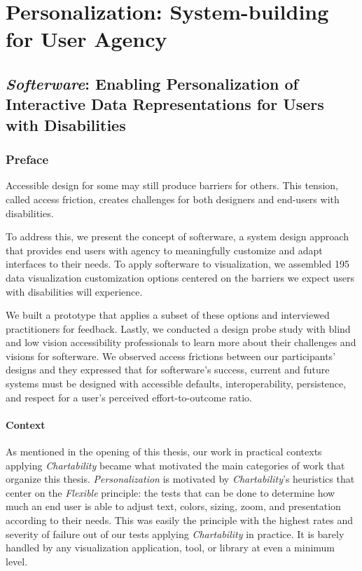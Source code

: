 \documentclass[12pt]{cmuthesis}
\begin{document}
\part{Personalization: System-building for User Agency}

\chapter{\textit{Softerware}: Enabling Personalization of Interactive Data Representations for Users with Disabilities}

\section{Preface}

Accessible design for some may still produce barriers for others. This tension, called access friction, creates challenges for both designers and end-users with disabilities.

To address this, we present the concept of softerware, a system design approach that provides end users with agency to meaningfully customize and adapt interfaces to their needs. To apply softerware to visualization, we assembled 195 data visualization customization options centered on the barriers we expect users with disabilities will experience.

We built a prototype that applies a subset of these options and interviewed practitioners for feedback. Lastly, we conducted a design probe study with blind and low vision accessibility professionals to learn more about their challenges and visions for softerware. We observed access frictions between our participants' designs and they expressed that for softerware's success, current and future systems must be designed with accessible defaults, interoperability, persistence, and respect for a user's perceived effort-to-outcome ratio.

\subsection{Context}

As mentioned in the opening of this thesis, our work in practical contexts applying \textit{Chartability} became what motivated the main categories of work that organize this thesis. \textit{Personalization} is motivated by \textit{Chartability}'s heuristics that center on the \textit{Flexible} principle: the tests that can be done to determine how much an end user is able to adjust text, colors, sizing, zoom, and presentation according to their needs. This was easily the principle with the highest rates and severity of failure out of our tests applying \textit{Chartability} in practice. It is barely handled by any visualization application, tool, or library at even a minimum level.
\end{document}
